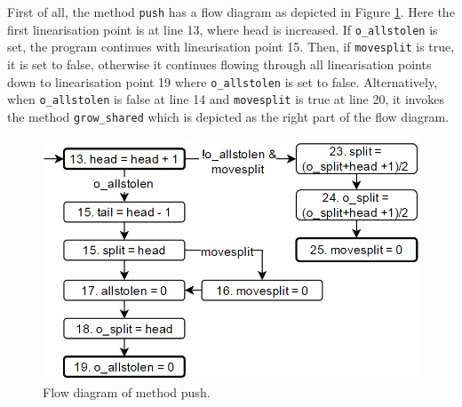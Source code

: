 \documentclass{sig-alternate-br}
\begin{document}
First of all, the method \texttt{push} has a flow diagram as depicted in Figure \ref{fig:push}.
Here the first linearisation point is at line 13, where head is increased.
If \texttt{o\_allstolen} is set, the program continues with linearisation point 15.
Then, if \texttt{movesplit} is true, it is set to false, otherwise it continues flowing through all linearisation points down to linearisation point 19 where \texttt{o\_allstolen} is set to false.
Alternatively, when \texttt{o\_allstolen} is false at line 14 and \texttt{movesplit} is true at line 20, it invokes the method \texttt{grow\_shared} which is depicted as the right part of the flow diagram.
\begin{figure}[h]
	\centering
	\includegraphics[scale=0.35]{Push_flow_diagram_2.png}
	\caption{Flow diagram of method push.}
	\label{fig:push}
\end{figure}
\end{document}
